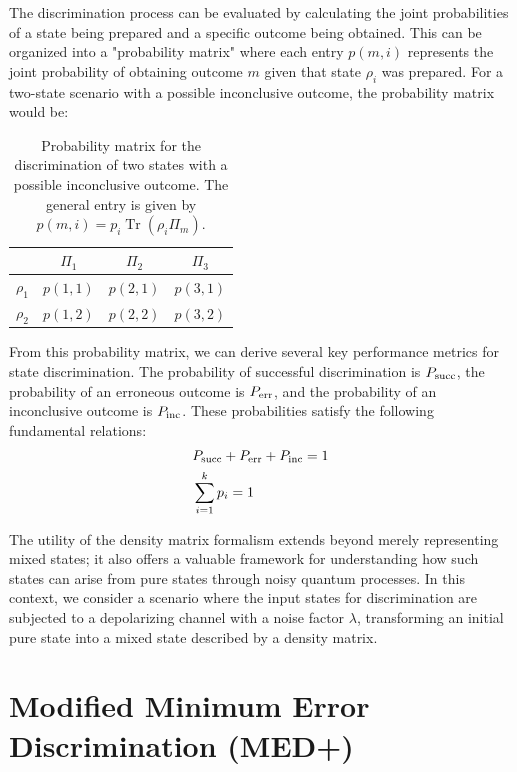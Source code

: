 The discrimination process can be evaluated by calculating the joint
probabilities of a state being prepared and a specific outcome being obtained.
This can be organized into a "probability matrix" where each entry $p(m,i)$
represents the joint probability of obtaining outcome $m$ given that
state $\rho_{i}$ was prepared.
For a two-state scenario with a possible inconclusive outcome, the probability
matrix would be:

\begin{table}[ht]
    \centering
    \begin{tabular}{c | c c c}
                   & $\Pi_{1}$ & $\Pi_{2}$ & $\Pi_{3}$ \\
        \hline
        $\rho_{1}$ & $p(1, 1)$ & $p(2, 1)$ & $p(3, 1)$ \\
        $\rho_{2}$ & $p(1, 2)$ & $p(2, 2)$ & $p(3, 2)$ \\
    \end{tabular}
    \caption{Probability matrix for the discrimination of two states with a possible inconclusive outcome. The general entry is given by $p(m,i) = p_{i} \operatorname{Tr}(\rho_{i} \Pi_{m})$.}
    \label{tab:prob_mat}
\end{table}

From this probability matrix, we can derive several key performance metrics for
state discrimination.
The probability of successful discrimination is $P_{\mathrm{succ}}$, the probability of
an erroneous outcome is $P_{\mathrm{err}}$, and the probability of an inconclusive
outcome is $P_{\mathrm{inc}}$.
These probabilities satisfy the following fundamental relations:
\begin{align}
     & P_{\mathrm{succ}} + P_{\mathrm{err}} + P_{\mathrm{inc}} = 1 \\
     & \sum_{i=1}^{k} p_{i} = 1
\end{align}

The utility of the density matrix formalism extends beyond merely representing
mixed states; it also offers a valuable framework for understanding how such
states can arise from pure states through noisy quantum processes.
In this context, we consider a scenario where the input states for
discrimination are subjected to a depolarizing channel with a noise factor $\lambda$,
transforming an initial pure state into a mixed state described by a density matrix.


\section{Modified Minimum Error Discrimination (MED+)}

